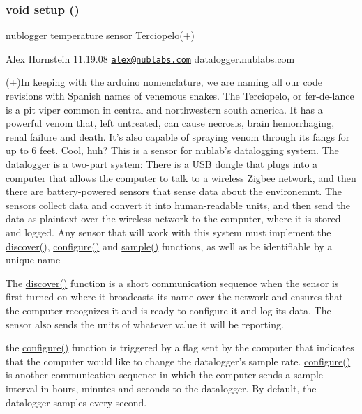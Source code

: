 \hypertarget{temperature__sensor___terciopelo_8pde_4fc01d736fe50cf5b977f755b675f11d}{
\subsubsection[{setup}]{\setlength{\rightskip}{0pt plus 5cm}void setup ()}}
\label{temperature__sensor___terciopelo_8pde_4fc01d736fe50cf5b977f755b675f11d}


nublogger temperature sensor Terciopelo(+)

Alex Hornstein 11.19.08 \href{mailto:alex@nublabs.com}{\tt alex@nublabs.com} datalogger.nublabs.com

(+)In keeping with the arduino nomenclature, we are naming all our code revisions with Spanish names of venemous snakes. The Terciopelo, or fer-de-lance is a pit viper common in central and northwestern south america. It has a powerful venom that, left untreated, can cause necrosis, brain hemorrhaging, renal failure and death. It's also capable of spraying venom through its fangs for up to 6 feet. Cool, huh? This is a sensor for nublab's datalogging system. The datalogger is a two-part system: There is a USB dongle that plugs into a computer that allows the computer to talk to a wireless Zigbee network, and then there are battery-powered sensors that sense data about the environemnt. The sensors collect data and convert it into human-readable units, and then send the data as plaintext over the wireless network to the computer, where it is stored and logged. Any sensor that will work with this system must implement the \hyperlink{nublogger_8h_3fdb2350c3f98c0de0f0ae3c831a8b14}{discover()}, \hyperlink{nublogger_8h_e369b3765489ee8bd0ea791c1843630f}{configure()} and \hyperlink{temperature__sensor___terciopelo_8pde_50a2ce599e896bfb535e70a42003ed23}{sample()} functions, as well as be identifiable by a unique name

The \hyperlink{nublogger_8h_3fdb2350c3f98c0de0f0ae3c831a8b14}{discover()} function is a short communication sequence when the sensor is first turned on where it broadcasts its name over the network and ensures that the computer recognizes it and is ready to configure it and log its data. The sensor also sends the units of whatever value it will be reporting.

the \hyperlink{nublogger_8h_e369b3765489ee8bd0ea791c1843630f}{configure()} function is triggered by a flag sent by the computer that indicates that the computer would like to change the datalogger's sample rate. \hyperlink{nublogger_8h_e369b3765489ee8bd0ea791c1843630f}{configure()} is another communication sequence in which the computer sends a sample interval in hours, minutes and seconds to the datalogger. By default, the datalogger samples every second.

